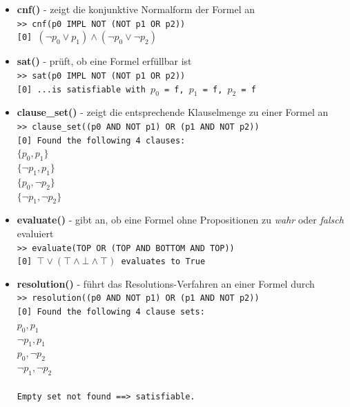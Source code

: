 \documentclass[11pt,a4paper,ngerman]{scrreprt}
\begin{document}
\begin{itemize}
\item \textbf{cnf()} - zeigt die konjunktive Normalform der Formel an \\
\texttt{>> cnf(p0 IMPL NOT (NOT p1 OR p2))} \\
\texttt{[0] $( \neg p_0 \vee p_1 ) \wedge ( \neg p_0 \vee \neg p_2 )$}

\item \textbf{sat()} - prüft, ob eine Formel erfüllbar ist \\
\texttt{>> sat(p0 IMPL NOT (NOT p1 OR p2))} \\
\texttt{[0] ...is satisfiable with $p_0$ = f, $p_1$ = f, $p_2$ = f}

\item \textbf{clause\_set()} - zeigt die entsprechende Klauselmenge zu einer Formel an \\
\texttt{>> clause\_set((p0 AND NOT p1) OR (p1 AND NOT p2))} \\
\texttt{[0] Found the following 4 clauses: \\
$\{p_0, p_1\}$ \\
$\{\neg p_1, p_1\}$ \\
$\{p_0, \neg p_2\}$ \\
$\{\neg p_1, \neg p_2\}$}

\item \textbf{evaluate()} - gibt an, ob eine Formel ohne Propositionen zu \textit{wahr} oder \textit{falsch} evaluiert \\
\texttt{>> evaluate(TOP OR (TOP AND BOTTOM AND TOP))} \\
\texttt{[0] $\top \vee ( \top \wedge \bot \wedge \top )$ evaluates to True}

\item \textbf{resolution()} - führt das Resolutions-Verfahren an einer Formel durch \\
\texttt{>> resolution((p0 AND NOT p1) OR (p1 AND NOT p2))} \\
\texttt{[0] Found the following 4 clause sets: \\
$p_0, p_1$ \\
$\neg p_1, p_1$ \\
$p_0, \neg p_2$ \\
$\neg p_1, \neg p_2$ \\\\
Empty set not found ==> satisfiable.}


\end{itemize}
\end{document}
